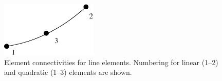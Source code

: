 \documentclass[11pt]{article}
\begin{document}
%
%
%
%
%
%
%
%
%
%
%
%
%
\begin{figure}[h!p]
\centering
     \includegraphics[width=1.8in]{figs/line3.xfig.eps}
     \caption{Element connectivities for line
     elements. Numbering for linear (1--2) and quadratic (1--3) elements are
     shown.}
     \label{el_num}
\end{figure}
\end{document}
